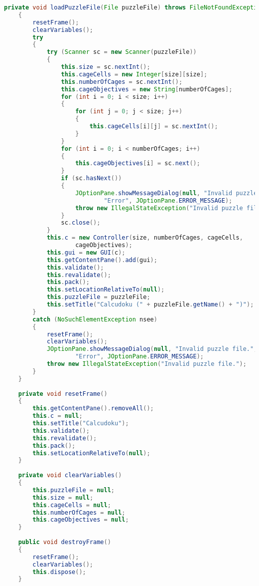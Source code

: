 \begin{lstlisting}[language=Java,basicstyle=\tiny,caption=Calcudoku.java]
    private void loadPuzzleFile(File puzzleFile) throws FileNotFoundException
    {
        resetFrame();
        clearVariables();
        try
        {
            try (Scanner sc = new Scanner(puzzleFile))
            {
                this.size = sc.nextInt();
                this.cageCells = new Integer[size][size];
                this.numberOfCages = sc.nextInt();
                this.cageObjectives = new String[numberOfCages];
                for (int i = 0; i < size; i++)
                {
                    for (int j = 0; j < size; j++)
                    {
                        this.cageCells[i][j] = sc.nextInt();
                    }
                }
                for (int i = 0; i < numberOfCages; i++)
                {
                    this.cageObjectives[i] = sc.next();
                }
                if (sc.hasNext())
                {
                    JOptionPane.showMessageDialog(null, "Invalid puzzle file.",
                            "Error", JOptionPane.ERROR_MESSAGE);
                    throw new IllegalStateException("Invalid puzzle file.");
                }
                sc.close();
            }
            this.c = new Controller(size, numberOfCages, cageCells,
                    cageObjectives);
            this.gui = new GUI(c);
            this.getContentPane().add(gui);
            this.validate();
            this.revalidate();
            this.pack();
            this.setLocationRelativeTo(null);
            this.puzzleFile = puzzleFile;
            this.setTitle("Calcudoku (" + puzzleFile.getName() + ")");
        }
        catch (NoSuchElementException nsee)
        {
            resetFrame();
            clearVariables();
            JOptionPane.showMessageDialog(null, "Invalid puzzle file.",
                    "Error", JOptionPane.ERROR_MESSAGE);
            throw new IllegalStateException("Invalid puzzle file.");
        }
    }
    
    private void resetFrame()
    {
        this.getContentPane().removeAll();
        this.c = null;
        this.setTitle("Calcudoku");
        this.validate();
        this.revalidate();
        this.pack();
        this.setLocationRelativeTo(null);
    }
    
    private void clearVariables()
    {
        this.puzzleFile = null;
        this.size = null;
        this.cageCells = null;
        this.numberOfCages = null;
        this.cageObjectives = null;
    }
    
    public void destroyFrame()
    {
        resetFrame();
        clearVariables();
        this.dispose();
    }
    

\end{lstlisting}
